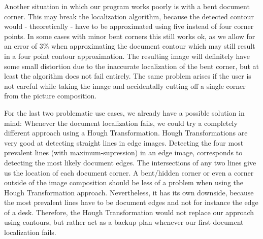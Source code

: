 \documentclass[bibliography=totoc]{scrartcl}
\begin{document}
Another situation in which our program works poorly is with a bent document corner.
This may break the localization algorithm, because the detected contour would - theoretically - have to be approximated using five instead of four corner points.
In some cases with minor bent corners this still works ok, as we allow for an error of 3\% when approximating the document contour which may still result in a four point contour approximation.
The resulting image will definitely have some small distortion due to the inaccurate localization of the bent corner, but at least the algorithm does not fail entirely.
The same problem arises if the user is not careful while taking the image and accidentally cutting off a single corner from the picture composition.

For the last two problematic use cases, we already have a possible solution in mind:
Whenever the document localization fails, we could try a completely different approach using a Hough Transformation.
Hough Transformations are very good at detecting straight lines in edge images.
Detecting the four most prevalent lines (with maximum-supression) in an edge image, corresponds to detecting the most likely document edges.
The intersections of any two lines give us the location of each document corner.
A bent/hidden corner or even a corner outside of the image composition should be less of a problem when using the Hough Transformation approach.
Nevertheless, it has its own downside, because the most prevalent lines have to be document edges and not for instance the edge of a desk.
Therefore, the Hough Transformation would not replace our approach using contours, but rather act as a backup plan whenever our first document localization fails.\\
\end{document}
